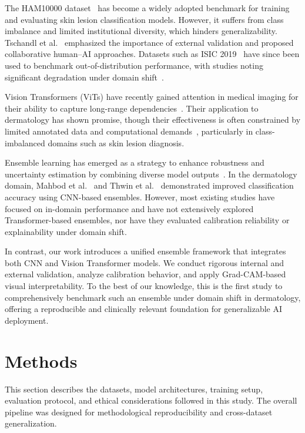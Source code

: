 \documentclass[pdflatex,sn-mathphys-num]{sn-jnl}%
\theoremstyle{thmstyleone}%
\theoremstyle{thmstyletwo}%
\theoremstyle{thmstylethree}%
\begin{document}
The HAM10000 dataset~\cite{tschandl2018ham10000} has become a widely adopted benchmark for training and evaluating skin lesion classification models. 
However, it suffers from class imbalance and limited institutional diversity, which hinders generalizability. 
Tschandl et al.~\cite{tschandl2020human} emphasized the importance of external validation and proposed collaborative human–AI approaches. 
Datasets such as ISIC 2019~\cite{codella2019skin} have since been used to benchmark out-of-distribution performance, with studies noting significant degradation under domain shift~\cite{winkler2019association}.

Vision Transformers (ViTs) have recently gained attention in medical imaging for their ability to capture long-range dependencies~\cite{shamshad2023transformers}. 
Their application to dermatology has shown promise, though their effectiveness is often constrained by limited annotated data and computational demands~\cite{he2023transformers}, particularly in class-imbalanced domains such as skin lesion diagnosis.

Ensemble learning has emerged as a strategy to enhance robustness and uncertainty estimation by combining diverse model outputs~\cite{lakshminarayanan2017simple}. 
In the dermatology domain, Mahbod et al.~\cite{mahbod2019fusing} and Thwin et al.~\cite{thwin2024skin} demonstrated improved classification accuracy using CNN-based ensembles. 
However, most existing studies have focused on in-domain performance and have not extensively explored Transformer-based ensembles, nor have they evaluated calibration reliability or explainability under domain shift.

In contrast, our work introduces a unified ensemble framework that integrates both CNN and Vision Transformer models. 
We conduct rigorous internal and external validation, analyze calibration behavior, and apply Grad-CAM-based visual interpretability. 
To the best of our knowledge, this is the first study to comprehensively benchmark such an ensemble under domain shift in dermatology, offering a reproducible and clinically relevant foundation for generalizable AI deployment.

\section{Methods}\label{sec3}

This section describes the datasets, model architectures, training setup, evaluation protocol, and ethical considerations followed in this study. The overall pipeline was designed for methodological reproducibility and cross-dataset generalization.
\end{document}
